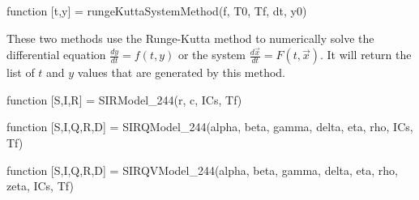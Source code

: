 \begin{matlab}
function [t,y] = rungeKuttaSystemMethod(f, T0, Tf, dt, y0)
\end{matlab}

These two methods use the Runge-Kutta method to numerically solve the differential equation $\frac{dy}{dt} = f(t,y)$ or the system $\frac{d\vec{x}}{dt} = F(t, \vec{x})$. It will return the list of $t$ and $y$ values that are generated by this method. 

\begin{matlab}
function [S,I,R] = SIRModel_244(r, c, ICs, Tf)
%
\end{matlab}

\begin{matlab}
function [S,I,Q,R,D] = SIRQModel_244(alpha, beta, gamma, delta, eta, rho, ICs, Tf)
%
\end{matlab}

\begin{matlab}
function [S,I,Q,R,D] = SIRQVModel_244(alpha, beta, gamma, delta, eta, rho, zeta, ICs, Tf)
%
\end{matlab}

